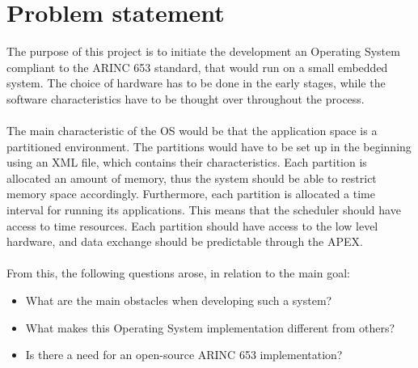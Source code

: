 \chapter{Problem statement}


The purpose of this project is to initiate the development an Operating System compliant to the 
ARINC 653 standard, that would run on a small embedded system.
The choice of hardware has to be done in the early stages, while the software characteristics
have to be thought over throughout the process.
\\\\
The main characteristic of the OS would be that the application space is a partitioned environment.
The partitions would have to be set up in the beginning using an XML file, which contains their 
characteristics. Each partition is allocated an amount of memory, thus the system should be able to restrict memory space accordingly.
Furthermore, each partition is allocated a time interval for running its applications. This means
that the scheduler should have access to time resources. Each partition should have access to the 
low level hardware, and data exchange should be predictable through the APEX. 
\\\\
From this, the following questions arose, in relation to the main goal:
\begin{itemize}
	\item What are the main obstacles when developing such a system?
	\item What makes this Operating System implementation different from others?
	\item Is there a need for an open-source ARINC 653 implementation?
\end{itemize}